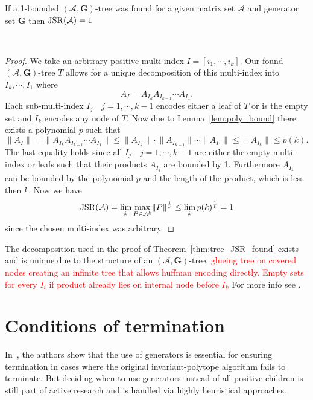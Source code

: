 \begin{theorem}
\label{thm:tree_JSR_found}
    If a 1-bounded $(\mathcal{A},\mathbf{G})\text{-tree}$ was found for a given matrix set $\mathcal{A}$ and generator set $\mathbf{G}$ then $\operatorname{JSR}(\mathcal{A}) = 1$
\end{theorem}
~
\begin{proof}
    We take an arbitrary positive multi-index $I = [i_1, \cdots, i_k]$.
    Our found $(\mathcal{A},\mathbf{G})\text{-tree } T$ allows for a unique decomposition of this multi-index into $I_k, \cdots, I_1$ where 
    $$ 
    A_I = A_{I_k}A_{I_{k-1}}\cdots A_{I_1}.
    $$ 
    Each sub-multi-index $I_j \quad j = 1, \cdots,k-1$ encodes either a leaf of $T$ or is the empty set and $I_k$ encodes any node of $T$. Now due to Lemma~\ref{lem:poly_bound} there exists a polynomial $p$ such that
    \[ 
        \lVert A_{I}  \rVert =  \lVert A_{I_k}A_{I_{k-1}}\cdots A_{I_1}\rVert \le  \lVert A_{I_k} \rVert \cdot \lVert A_{I_{k-1}}\rVert \cdots \lVert A_{I_1} \rVert \le \lVert A_{I_k} \rVert\le p(k).
    \]
    The last equality holds since all $I_j \quad j = 1, \cdots,k-1$ are either the empty multi-index or leafs such that their products $A_{I_j}$ are bounded by 1. 
    Furthermore $A_{I_k}$ can be bounded by the polynomial $p$ and the length of the product, which is less then $k$. 
    Now we have
      $$\operatorname{JSR}(\mathcal{A}) = \lim_k \max_{P \in \mathcal{A}^k} \lVert P \rVert ^{\frac{1}{k}} \leq \lim_k p(k) ^{\frac{1}{k}}  = 1$$
    since the chosen multi-index was arbitrary.
\end{proof}

\begin{remark}
    The decomposition used in the proof of Theorem~\ref{thm:tree_JSR_found} exists and is unique due to the structure of an $(\mathcal{A},\mathbf{G})\text{-tree}$.
    \textcolor{red}{glueing tree on covered nodes creating an infinite tree that allows huffman encoding directly. Empty sets for every $I_i$ if product already lies on internal node before $I_k$}
    For more info see \citep{mollerTreebasedApproachJoint2014}.
\end{remark}

\section{Conditions of termination}

\begin{remark}
    In~\citep{mollerTreebasedApproachJoint2014}, the authors show that the use of generators is essential for ensuring termination in cases where the original invariant-polytope algorithm fails to terminate. But deciding when to use generators instead of all positive children is still part of active research and is handled via highly heuristical approaches. 
\end{remark}


